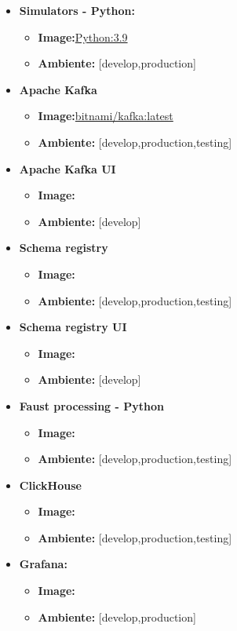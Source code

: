 \begin{itemize}
  \item \textbf{Simulators - Python:} 
  \begin{itemize}
    \item \textbf{Image:}\href{https://hub.docker.com/_/python}{Python:3.9}
    \item \textbf{Ambiente:} [develop,production]
  \end{itemize}
  \item \textbf{Apache Kafka} 
 \begin{itemize}
    \item \textbf{Image:}\href{https://hub.docker.com/layers/bitnami/kafka/latest/images/sha256-4894d89d28f8e06a7d8a064efdc2dc9cb61dd205721c61296b6d033ad4824a91?context=explore}{bitnami/kafka:latest}
    \item \textbf{Ambiente:} [develop,production,testing]
  \end{itemize}
  \item \textbf{Apache Kafka UI} 
 \begin{itemize}
    \item \textbf{Image:}
    \item \textbf{Ambiente:} [develop]
  \end{itemize}
  \item \textbf{Schema registry} 
 \begin{itemize}
    \item \textbf{Image:}
    \item \textbf{Ambiente:} [develop,production,testing]
  \end{itemize}
  \item \textbf{Schema registry UI} 
 \begin{itemize}
    \item \textbf{Image:}
    \item \textbf{Ambiente:} [develop]
  \end{itemize}
  \item \textbf{Faust processing - Python} 
 \begin{itemize}
    \item \textbf{Image:}
    \item \textbf{Ambiente:} [develop,production,testing]
  \end{itemize}
  \item \textbf{ClickHouse} 
  \begin{itemize}
    \item \textbf{Image:}
    \item \textbf{Ambiente:} [develop,production,testing]
  \end{itemize}
  \item \textbf{Grafana:} 
  \begin{itemize}
    \item \textbf{Image:}
    \item \textbf{Ambiente:} [develop,production]
  \end{itemize}
\end{itemize}

